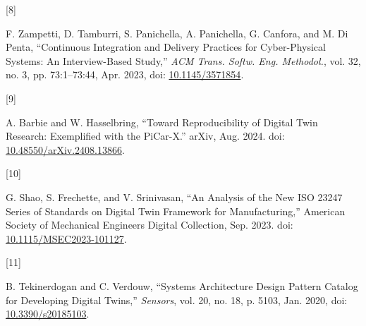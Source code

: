 \documentclass[
  12pt,
  a4paper,
]{article}
\newlength{\cslhangindent}
\newlength{\csllabelwidth}
\newenvironment{CSLReferences}[2] %
 {\begin{list}{}{%
  \setlength{\itemindent}{0pt}
  \setlength{\leftmargin}{0pt}
  \setlength{\parsep}{0pt}
  \ifodd #1
   \setlength{\leftmargin}{\cslhangindent}
   \setlength{\itemindent}{-1\cslhangindent}
  \fi
  \setlength{\itemsep}{#2\baselineskip}}}
 {\end{list}}
\newcommand{\CSLLeftMargin}[1]{\parbox[t]{\csllabelwidth}{\strut#1\strut}}
\newcommand{\CSLRightInline}[1]{\parbox[t]{\linewidth - \csllabelwidth}{\strut#1\strut}}
\begin{document}
\begin{CSLReferences}{0}{0}
\CSLLeftMargin{{[}8{]} }%
\CSLRightInline{F. Zampetti, D. Tamburri, S. Panichella, A. Panichella,
G. Canfora, and M. Di Penta, {``Continuous {Integration} and {Delivery}
{Practices} for {Cyber}-{Physical} {Systems}: {An} {Interview}-{Based}
{Study},''} \emph{ACM Trans. Softw. Eng. Methodol.}, vol. 32, no. 3, pp.
73:1--73:44, Apr. 2023, doi:
\href{https://doi.org/10.1145/3571854}{10.1145/3571854}.}

\CSLLeftMargin{{[}9{]} }%
\CSLRightInline{A. Barbie and W. Hasselbring, {``Toward
{Reproducibility} of {Digital} {Twin} {Research}: {Exemplified} with the
{PiCar}-{X}.''} arXiv, Aug. 2024. doi:
\href{https://doi.org/10.48550/arXiv.2408.13866}{10.48550/arXiv.2408.13866}.}

\CSLLeftMargin{{[}10{]} }%
\CSLRightInline{G. Shao, S. Frechette, and V. Srinivasan, {``An
{Analysis} of the {New} {ISO} 23247 {Series} of {Standards} on {Digital}
{Twin} {Framework} for {Manufacturing},''} American Society of
Mechanical Engineers Digital Collection, Sep. 2023. doi:
\href{https://doi.org/10.1115/MSEC2023-101127}{10.1115/MSEC2023-101127}.}

\CSLLeftMargin{{[}11{]} }%
\CSLRightInline{B. Tekinerdogan and C. Verdouw, {``Systems
{Architecture} {Design} {Pattern} {Catalog} for {Developing} {Digital}
{Twins},''} \emph{Sensors}, vol. 20, no. 18, p. 5103, Jan. 2020, doi:
\href{https://doi.org/10.3390/s20185103}{10.3390/s20185103}.}

\end{CSLReferences}
\end{document}
